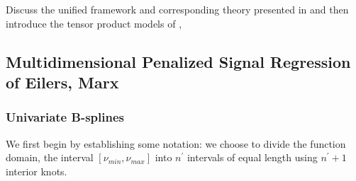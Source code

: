 \documentclass[12pt]{article}
\newcommand*\outlineskeleton{\color{green}}
\begin{document}
{\outlineskeleton Discuss the unified framework and corresponding theory presented in \cite{huang2001concave} and then introduce the tensor product models of \cite{eilers2003multivariate}, \cite{marx2005multidimensional}}


\subsection{{\outlineskeleton Multidimensional Penalized Signal Regression of Eilers, Marx}}


\subsubsection{{\outlineskeleton Univariate B-splines}}

We first begin by establishing some notation: we choose to divide the function domain, the interval $\left[\nu_{min},\nu_{max} \right]$ into $n^\prime$ intervals of equal length using $n^\prime + 1$ interior knots.
\end{document}
